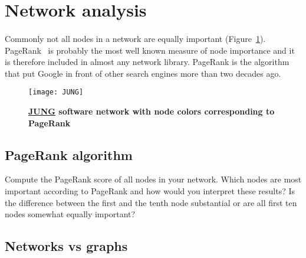 \documentclass[11pt,a4paper]{article}
\newcommand{\figref}[1]{{\color{LimeGreen}Figure~\ref{fig:#1}}}
\begin{document}
%

\section{Network analysis}

\paragraph{} Commonly not all nodes in a network are equally important (\figref{JUNG}). PageRank~\cite{BP98} is probably the most well known measure of node importance and it is therefore included in almost any network library. PageRank is the algorithm that put Google in front of other search engines more than two decades ago.

\begin{figure}[t] \centering
	\texttt{[image: JUNG]}
	\caption{{\bf \href{http://jung.sourceforge.net}{JUNG} software network with node colors corresponding to PageRank}}
	\label{fig:JUNG}
\end{figure}

\subsection{PageRank algorithm}

Compute the PageRank score of all nodes in your network. Which nodes are most important according to PageRank and how would you interpret these results? Is the difference between the first and the tenth node substantial or are all first ten nodes somewhat equally important?

\subsection{Networks vs graphs}
\end{document}
